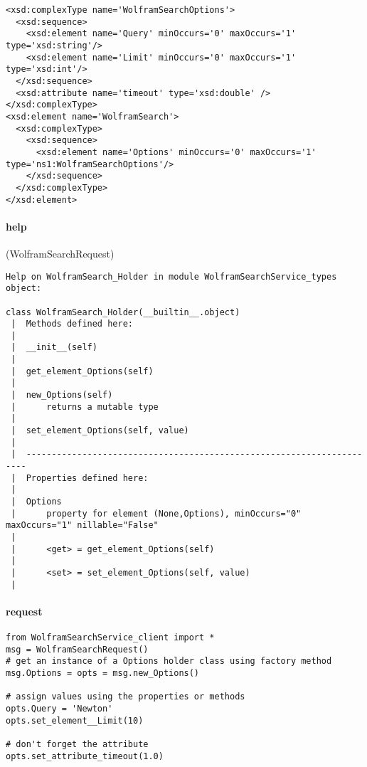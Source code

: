 \begin{verbatim}
<xsd:complexType name='WolframSearchOptions'>
  <xsd:sequence>
    <xsd:element name='Query' minOccurs='0' maxOccurs='1' type='xsd:string'/>
    <xsd:element name='Limit' minOccurs='0' maxOccurs='1' type='xsd:int'/>
  </xsd:sequence>
  <xsd:attribute name='timeout' type='xsd:double' />
</xsd:complexType>
<xsd:element name='WolframSearch'>
  <xsd:complexType>
    <xsd:sequence>
      <xsd:element name='Options' minOccurs='0' maxOccurs='1' type='ns1:WolframSearchOptions'/>
    </xsd:sequence>
  </xsd:complexType>
</xsd:element>
\end{verbatim}
\par

\paragraph{help}(WolframSearchRequest)
\begin{verbatim}
Help on WolframSearch_Holder in module WolframSearchService_types object:

class WolframSearch_Holder(__builtin__.object)
 |  Methods defined here:
 |  
 |  __init__(self)
 |  
 |  get_element_Options(self)
 |  
 |  new_Options(self)
 |      returns a mutable type
 |  
 |  set_element_Options(self, value)
 |  
 |  ----------------------------------------------------------------------
 |  Properties defined here:
 |  
 |  Options
 |      property for element (None,Options), minOccurs="0" maxOccurs="1" nillable="False"
 |  
 |      <get> = get_element_Options(self)
 |  
 |      <set> = set_element_Options(self, value)
 |  
\end{verbatim}
\par

\paragraph{request}
\begin{verbatim}
from WolframSearchService_client import *
msg = WolframSearchRequest()
# get an instance of a Options holder class using factory method
msg.Options = opts = msg.new_Options()

# assign values using the properties or methods
opts.Query = 'Newton'
opts.set_element__Limit(10)

# don't forget the attribute
opts.set_attribute_timeout(1.0)

\end{verbatim}
\par

